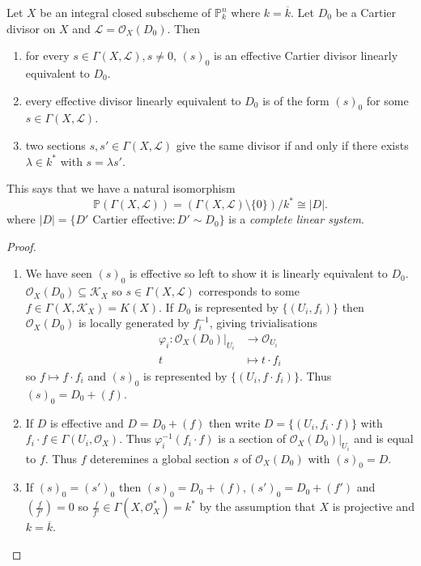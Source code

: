 \documentclass[a4paper]{article}
\renewcommand*{\P}{\mathbb{P}}
\newcommand{\sh}[1]{\mathcal{#1}} %
\begin{document}
\begin{theorem}
  Let \(X\) be an integral closed subscheme of \(\P^n_k\) where \(k = \overline k\). Let \(D_0\) be a Cartier divisor on \(X\) and \(\sh L = \sh O_X(D_0)\). Then
  \begin{enumerate}
  \item for every \(s \in \Gamma(X, \sh L), s \neq 0\), \((s)_0\) is an effective Cartier divisor linearly equivalent to \(D_0\).
  \item every effective divisor linearly equivalent to \(D_0\) is of the form \((s)_0\) for some \(s \in \Gamma(X, \sh L)\).
  \item two sections \(s, s' \in \Gamma(X, \sh L)\) give the same divisor if and only if there exists \(\lambda \in k^*\) with \(s = \lambda s'\).
  \end{enumerate}
\end{theorem}

This says that we have a natural isomorphism
\[
  \P(\Gamma(X, \sh L)) = (\Gamma(X, \sh L) \setminus \{0\})/k^* \cong |D|.
\]
where \(|D| = \{D' \text{ Cartier effective}: D' \sim D_0\}\) is a \emph{complete linear system}.

\begin{proof}\leavevmode
  \begin{enumerate}
  \item We have seen \((s)_0\) is effective so left to show it is linearly equivalent to \(D_0\). \(\sh O_X(D_0) \subseteq \sh K_X\) so \(s \in \Gamma(X, \sh L)\) corresponds to some \(f \in \Gamma(X, \sh K_X) = K(X)\). If \(D_0\) is represented by \(\{(U_i, f_i)\}\) then \(\sh O_X(D_0)\) is locally generated by \(f_i^{-1}\), giving trivialisations
    \begin{align*}
      \varphi_i: \sh O_X(D_0)|_{U_i} &\to \sh O_{U_i} \\
      t &\mapsto t \cdot f_i
    \end{align*}
    so \(f \mapsto f \cdot f_i\) and \((s)_0\) is represented by \(\{(U_i, f \cdot f_i)\}\). Thus \((s)_0 = D_0 + (f)\).
  \item If \(D\) is effective and \(D = D_0 + (f)\) then write \(D = \{(U_i, f_i \cdot f)\}\) with \(f_i \cdot f \in \Gamma(U_i, \sh O_X)\). Thus \(\varphi_i^{-1}(f_i \cdot f)\) is a section of \(\sh O_X(D_0)|_{U_i}\) and is equal to \(f\). Thus \(f\) deteremines a global section \(s\) of \(\sh O_X(D_0)\) with \((s)_0 = D\).
  \item If \((s)_0 = (s')_0\) then \((s)_0 = D_0 + (f), (s')_0 = D_0 + (f')\) and \((\frac{f}{f'}) = 0\) so \(\frac{f}{f'} \in \Gamma(X, \sh O_X^*) = k^*\) by the assumption that \(X\) is projective and \(k = \overline k\).
  \end{enumerate}
\end{proof}
\end{document}
